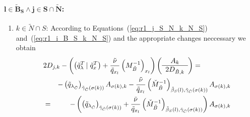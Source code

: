 \documentclass[a4paper]{article}
\begin{document}
\paragraph{$\mathbf{l \in \tilde{B}_{S} \wedge j \in S \cap \tilde{N}}$:}
\begin{enumerate}
\item $k \in \tilde{N} \cap S$:
According to Equations~(\ref{eq:r1_j_S_N_k_N_S})
and~(\ref{eq:r1_i_B_S_k_N_S}) and the appropriate changes neccessary we obtain
\begin{eqnarray}
\lefteqn{
2D_{j,k}-\left(
          \left(\tilde{q}_{\lambda}^{T}\left|\right. \tilde{q}_{x}^{T}\right)
	  +\frac{\tilde{\nu}}{\tilde{q}_{x_{l}}}
	  \left(M_{\tilde{B}}^{-1}\right)_{x_{l}}
	\right)
\left(\begin{array}{c}
        A_{k} \\
	\hline
	2D_{\tilde{B},k}
      \end{array}
\right)
=}
\nonumber \\
&&
-\left(\tilde{q}_{\lambda_{\tilde{C}}}\right)_{\tilde{\gamma}_{\tilde{C}}
 (\sigma(k))}A_{\sigma(k),k}
-\frac{\tilde{\nu}}{\tilde{q}_{x_{l}}}
  \left(\check{M}_{\tilde{B}}^{-1}\right)_{\tilde{\beta}_{S}(l),
  \tilde{\gamma}_{\tilde{C}}(\sigma(k))}A_{\sigma(k), k}
\nonumber \\
&=&
-\left(
  \left(\tilde{q}_{\lambda_{\tilde{C}}}\right)_{\tilde{\gamma}_{\tilde{C}}
   (\sigma(k))}
  +\frac{\tilde{\nu}}{\tilde{q}_{x_{l}}} 
  \left(\check{M}_{\tilde{B}}^{-1}\right)_{\tilde{\beta}_{S}(l),
  \tilde{\gamma}_{\tilde{C}}(\sigma(k))}
\right)
A_{\sigma(k), k}  
\end{eqnarray}


\end{enumerate}
\end{document}
